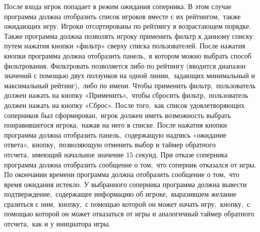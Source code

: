 \documentclass[14pt,a4paper]{report}
\begin{document}
После входа игрок попадает в режим ожидания соперника. В этом случае программа должна отобразить список игроков вместе с их рейтингом,~также ожидающих игру. Игроки отсортированы по рейтингу в возрастающем порядке. Также программа должна позволять игроку применить фильтр к данному списку путем нажатия кнопки «фильтр» сверху списка пользователей. После нажатия кнопки программа должна отобразить панель,~в котором можно выбрать способ фильтрования. Фильтровать позволяется либо по рейтингу (вводится диапазон значений с помощью двух ползунков на одной линии,~задающих минимальный и максимальный рейтинг),~либо по имени. Чтобы применить фильтр,~пользователь должен нажать на кнопку «Применить»,~чтобы сбросить фильтр,~пользователь должен нажать на кнопку «Сброс». После того,~как список удовлетворяющих соперников был сформирован,~игрок должен иметь возможность выбрать понравившегося игрока,~нажав на него в списке. После нажатия кнопки программа должна отобразить панель,~содержащую надпись «ожидание ответа»,~кнопку,~позволяющую отменить выбор и таймер обратного отсчета,~имеющий начальное значение $15$ секунд. При отказе соперника программа должна отобразить сообщение о том,~что соперник отказался от игры. По окончании времени программа должна отобразить сообщение о том,~что время ожидания истекло. У выбранного соперника программа должна вывести подтверждение,~содержащее информацию об игроке,~выразившем желание сразиться с ним,~кнопку,~с помощью которой он может начать игру,~кнопку,~с помощью которой он может отказаться от игры и аналогичный таймер обратного отсчета,~как и у инициатора игры. 
\end{document}
